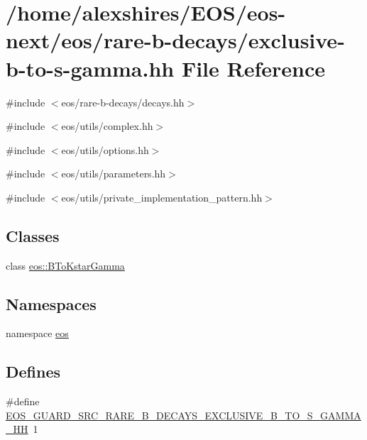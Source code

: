 \hypertarget{exclusive-b-to-s-gamma_8hh}{
\section{/home/alexshires/EOS/eos-\/next/eos/rare-\/b-\/decays/exclusive-\/b-\/to-\/s-\/gamma.hh File Reference}
\label{exclusive-b-to-s-gamma_8hh}
}
{\ttfamily \#include $<$eos/rare-\/b-\/decays/decays.hh$>$}\par
{\ttfamily \#include $<$eos/utils/complex.hh$>$}\par
{\ttfamily \#include $<$eos/utils/options.hh$>$}\par
{\ttfamily \#include $<$eos/utils/parameters.hh$>$}\par
{\ttfamily \#include $<$eos/utils/private\_\-implementation\_\-pattern.hh$>$}\par
\subsection*{Classes}
\begin{DoxyCompactItemize}
\item 
class \hyperlink{classeos_1_1BToKstarGamma}{eos::BToKstarGamma}
\end{DoxyCompactItemize}
\subsection*{Namespaces}
\begin{DoxyCompactItemize}
\item 
namespace \hyperlink{namespaceeos}{eos}
\end{DoxyCompactItemize}
\subsection*{Defines}
\begin{DoxyCompactItemize}
\item 
\#define \hyperlink{exclusive-b-to-s-gamma_8hh_a72b09cd65ad01642d109aba1c0203aae}{EOS\_\-GUARD\_\-SRC\_\-RARE\_\-B\_\-DECAYS\_\-EXCLUSIVE\_\-B\_\-TO\_\-S\_\-GAMMA\_\-HH}~1
\end{DoxyCompactItemize}


